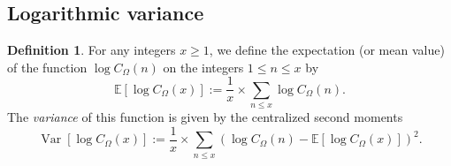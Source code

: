 \documentclass[11pt,reqno,a4letter]{article}
\numberwithin{equation}{section}
\numberwithin{figure}{section}
\numberwithin{table}{section}
\theoremstyle{plain}
\numberwithin{theorem}{section}
\theoremstyle{definition}
\newtheorem{definition}[theorem]{Definition}
\theoremstyle{remark}
\begin{document}
\subsection{Logarithmic variance}
\label{subSection_AvgOrdersOfTheUnsignedSequences} 

\begin{definition}
\label{def_AvgOrder_FirstAndSecondMomentsOfFuncs_v1}
For any integers $x \geq 1$, we define the expectation (or mean value) of the 
function $\log C_{\Omega}(n)$ on the integers $1 \leq n \leq x$ by 
\[
\mathbb{E}\left[\log C_{\Omega}(x)\right] := \frac{1}{x} \times \sum_{n \leq x} 
     \log C_{\Omega}(n). 
\]
The \emph{variance} of this function is given by the 
centralized second moments 
\[
\operatorname{Var}\left[\log C_{\Omega}(x)\right] := 
	\frac{1}{x} \times \sum_{n \leq x} \left(\log C_{\Omega}(n) - 
	\mathbb{E}\left[\log C_{\Omega}(x)\right]\right)^2. 
\]
\end{definition}
\end{document}
